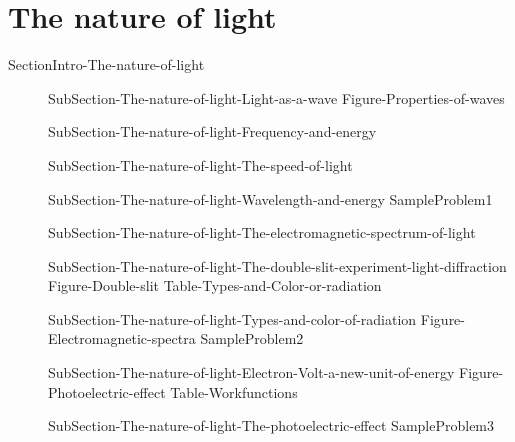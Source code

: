 \documentclass[main.tex]{subfiles}
\newcommand\chapterlabel{Ch-radiation}\setcounter{figurenewcounter}{0}\setcounter{tablenewcounter}{0}\setcounter{formulanewcounter}{0}
\begin{document}
\section{The nature of light}{SectionIntro-The-nature-of-light}
\sloppy
\begin{description}
\item[]{SubSection-The-nature-of-light-Light-as-a-wave}
{Figure-Properties-of-waves}
\item[] {SubSection-The-nature-of-light-Frequency-and-energy}
\item[] {SubSection-The-nature-of-light-The-speed-of-light}
\item[] {SubSection-The-nature-of-light-Wavelength-and-energy}
  {SampleProblem1}
\item[]{SubSection-The-nature-of-light-The-electromagnetic-spectrum-of-light}
  \vspace{-1cm}{Figure-Electromagnetic-field}
\item[] {SubSection-The-nature-of-light-The-double-slit-experiment-light-diffraction}
 {Figure-Double-slit}
 \vspace{1cm}\hspace{-5cm}{Figure-waves-and-life}
{Table-Types-and-Color-or-radiation}
\item[] {SubSection-The-nature-of-light-Types-and-color-of-radiation}
{Figure-Electromagnetic-spectra}
  {SampleProblem2}
\item[]{SubSection-The-nature-of-light-Electron-Volt-a-new-unit-of-energy}
{Figure-Photoelectric-effect}
{Table-Workfunctions}
\item[]{SubSection-The-nature-of-light-The-photoelectric-effect}
  {SampleProblem3}
\end{description}
\end{document}
